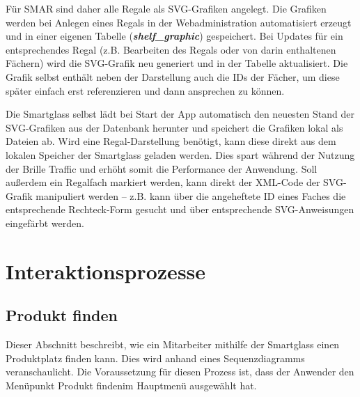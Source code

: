 Für SMAR sind daher alle Regale als \acs{SVG}-Grafiken angelegt. Die Grafiken werden bei Anlegen eines Regals in der Webadministration automatisiert erzeugt und in einer eigenen Tabelle (\textbf{\textit{shelf\_graphic}}) gespeichert. Bei Updates für ein entsprechendes Regal (z.B. Bearbeiten des Regals oder von darin enthaltenen Fächern) wird die \acs{SVG}-Grafik neu generiert und in der Tabelle aktualisiert. Die Grafik selbst enthält neben der Darstellung auch die IDs der Fächer, um diese später einfach erst referenzieren und dann ansprechen zu können.

Die Smartglass selbst lädt bei Start der App automatisch den neuesten Stand der \acs{SVG}-Grafiken aus der Datenbank herunter und speichert die Grafiken lokal als Dateien ab. Wird eine Regal-Darstellung benötigt, kann diese direkt aus dem lokalen Speicher der Smartglass geladen werden. Dies spart während der Nutzung der Brille Traffic und erhöht somit die Performance der Anwendung. Soll außerdem ein Regalfach markiert werden, kann direkt der \acs{XML}-Code der \acs{SVG}-Grafik manipuliert werden -- z.B. kann über die angeheftete ID eines Faches die entsprechende Rechteck-Form gesucht und über entsprechende \acs{SVG}-Anweisungen eingefärbt werden.


\section{Interaktionsprozesse}

\subsection{Produkt finden}
\label{sec:produkt_finden}
Dieser Abschnitt beschreibt, wie ein Mitarbeiter mithilfe der Smartglass einen Produktplatz finden kann. Dies wird anhand eines Sequenzdiagramms veranschaulicht. Die Voraussetzung für diesen Prozess ist, dass der Anwender den Menüpunkt \glqq Produkt finden\grqq  im Hauptmenü ausgewählt hat.

